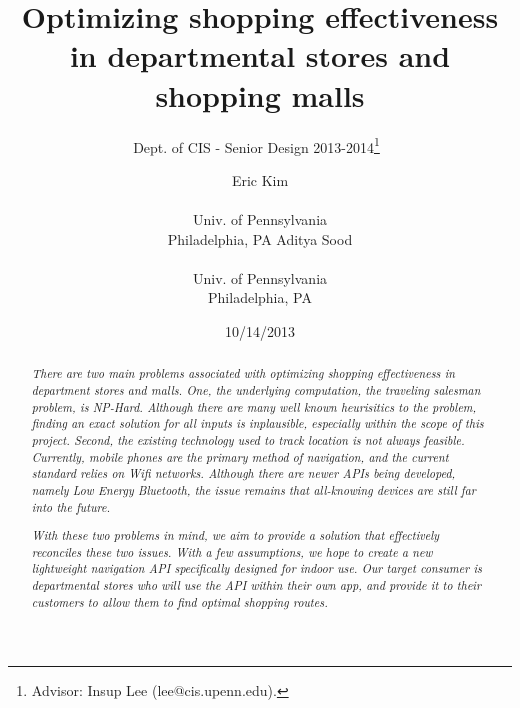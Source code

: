 \documentclass{sig-alternate}
\begin{document}
 

\title{Optimizing shopping effectiveness in departmental stores and shopping malls}
\subtitle{Dept. of CIS - Senior Design 2013-2014\thanks{Advisor: Insup Lee (lee@cis.upenn.edu).}~}
\author{
\alignauthor Eric Kim \\  \\ Univ. of Pennsylvania \\ Philadelphia, PA
\alignauthor  Aditya Sood\\  \\ Univ. of Pennsylvania \\ Philadelphia, PA}
\date{10/14/2013}
\maketitle


\begin{abstract}
  \textit{There are two main problems associated with optimizing
    shopping effectiveness in department stores and malls. One,  
    the underlying computation, the traveling salesman problem, 
    is NP-Hard. Although there are many well known heurisitics 
    to the problem, finding an exact solution for all inputs is 
    inplausible, especially within the scope of this project. Second, 
    the existing technology used to track location is not always 
    feasible. Currently, mobile phones are the primary method of 
    navigation, and the current standard relies on Wifi networks. 
    Although there are newer APIs being developed, namely Low 
    Energy Bluetooth, the issue remains that all-knowing devices
    are still far into the future.
    }

  \textit{With these two problems in mind, we aim to provide a 
    solution that effectively reconciles these two issues. With a few 
    assumptions, we hope to create a new lightweight navigation 
    API specifically designed for indoor use. Our target consumer 
    is departmental stores who will use the API within their own 
    app, and provide it to their customers to allow them to find 
    optimal shopping routes.}
\end{abstract}
\end{document}
